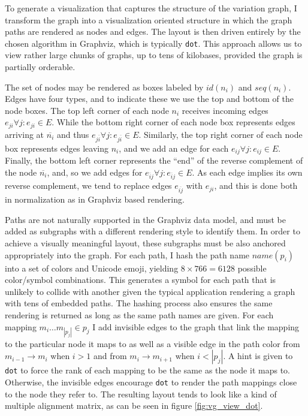To generate a visualization that captures the structure of the variation graph, I transform the graph into a visualization oriented structure in which the graph paths are rendered as nodes and edges.
The layout is then driven entirely by the chosen algorithm in Graphviz, which is typically {\tt dot}.
This approach allows us to view rather large chunks of graphs, up to tens of kilobases, provided the graph is partially orderable.

The set of nodes may be rendered as boxes labeled by $id(n_i)$ and $seq(n_i)$.
Edges have four types, and to indicate these we use the top and bottom of the node boxes.
The top left corner of each node $n_i$ receives incoming edges $e_{ji} \forall j : e_{ji} \in E$.
While the bottom right corner of each node box represents edges arriving at $\overline{n_i}$ and thus $e_{j\overline{i}} \forall j : e_{j\overline{i}} \in E$.
Similarly, the top right corner of each node box represents edges leaving $n_i$, and we add an edge for each $e_{ij} \forall j : e_{ij} \in E$.
Finally, the bottom left corner represents the ``end'' of the reverse complement of the node $\overline{n_i}$, and, so we add edges for $e_{\overline{i}j} \forall j : e_{\overline{i}j} \in E$.
As each edge implies its own reverse complement, we tend to replace edges $e_{\overline{ij}}$ with $e_{ji}$, and this is done both in normalization as in Graphviz based rendering.

Paths are not naturally supported in the Graphviz data model, and must be added as subgraphs with a different rendering style to identify them.
In order to achieve a visually meaningful layout, these subgraphs must be also anchored appropriately into the graph.
For each path, I hash the path name $name(p_i)$ into a set of colors and Unicode emoji, yielding $8 \times 766 = 6128$ possible color/symbol combinations.
This generates a symbol for each path that is unlikely to collide with another given the typical application rendering a graph with tens of embedded paths.
The hashing process also ensures the same rendering is returned as long as the same path names are given.
For each mapping $m_i\ldots m_{|p_j|} \in p_j$ I add invisible edges to the graph that link the mapping to the particular node it maps to as well as a visible edge in the path color from $m_{i-1} \to m_i$ when $i > 1$ and from $m_i \to m_{i+1}$ when $i < |p_j|$.
A hint is given to {\tt dot} to force the rank of each mapping to be the same as the node it maps to.
Otherwise, the invisible edges encourage {\tt dot} to render the path mappings close to the node they refer to.
The resulting layout tends to look like a kind of multiple alignment matrix, as can be seen in figure \ref{fig:vg_view_dot}.


